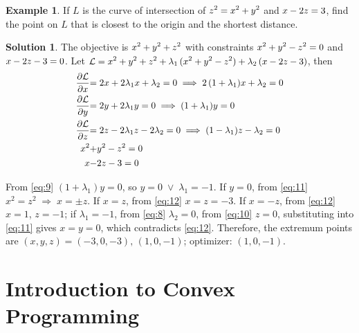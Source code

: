 \documentclass[10pt,handout]{beamer}
\newcommand{\ds}{\displaystyle}
\newcommand{\ie}{\;\Longrightarrow\;}
\newcommand{\orr}{\;\vee\;}
\theoremstyle{definition}
\newtheorem*{ex}{Example}
\newtheorem*{sol}{Solution}
\newcommand{\pdiff}[2]{\frac{\partial #1}{\partial #2}}
\newcommand\scalemath[2]{\scalebox{#1}{\mbox{\ensuremath{\displaystyle #2}}}}
\begin{document}
\begin{frame}
  \begin{ex}
    If $L$ is the curve of intersection of $\scalemath{0.95}{z^2 = x^2 + y^2}$ and $\scalemath{0.95}{x - 2z = 3}$, find the point on $L$ that is closest to the origin and the shortest distance. 
  \end{ex}

  \begin{sol}
    The objective is $\scalemath{0.95}{x^2 + y^2 + z^2}$ with constraints $\scalemath{0.95}{x^2 + y^2 - z^2 = 0}$ and $\scalemath{0.95}{x - 2z - 3 = 0}$. Let $\ds\scalemath{0.95}{\mathcal{L} = x^2 + y^2 + z^2 + \lambda_1\,(x^2 + y^2 - z^2) + \lambda_2\,(x - 2z - 3)}$, then \vspace{-3mm}
    \begin{align}
      \scalemath{0.95}{\pdiff{\mathcal{L}}{x}} &\scalemath{0.95}{= 2 x + 2\lambda_1 x + \lambda_2 = 0 \ie 2\,(1 + \lambda_1) x + \lambda_2 = 0}\label{eq:8}\\
      \scalemath{0.95}{\pdiff{\mathcal{L}}{y}} &\scalemath{0.95}{= 2 y + 2\lambda_1 y = 0 \ie (1 + \lambda_1)y = 0}\label{eq:9} \\
      \scalemath{0.95}{\pdiff{\mathcal{L}}{z}} &\scalemath{0.95}{= 2 z - 2\lambda_1 z - 2\lambda_2 = 0 \ie (1 - \lambda_1)z - \lambda_2 = 0}\label{eq:10}\\
      \scalemath{0.95}{x^2} &\scalemath{0.95}{+ y^2 - z^2 = 0}\label{eq:11} \\
      \scalemath{0.95}{x} &\scalemath{0.95}{- 2z - 3 = 0}\label{eq:12}
    \end{align}
    
    \vspace{-3mm}
    From \eqref{eq:9} $(1 + \lambda_1) y = 0$, so $y = 0\orr\lambda_1 = -1$. If $y = 0$, from \eqref{eq:11} $x^2 = z^2 \ie x = \pm z$. If $x = z$, from \eqref{eq:12} $x = z = -3$. If $x = -z$, from \eqref{eq:12} $x = 1$, $z = -1$; if $\lambda_1 = -1$, from \eqref{eq:8} $\lambda_2 = 0$, from \eqref{eq:10} $z = 0$, substituting into \eqref{eq:11} gives $x = y = 0$, which contradicts \eqref{eq:12}. Therefore, the extremum points are $(x, y, z) = (-3, 0, -3),\,(1, 0, -1)$; optimizer: $(1, 0, -1)$.
  \end{sol}
\end{frame}

\section{Introduction to Convex Programming}
\end{document}
